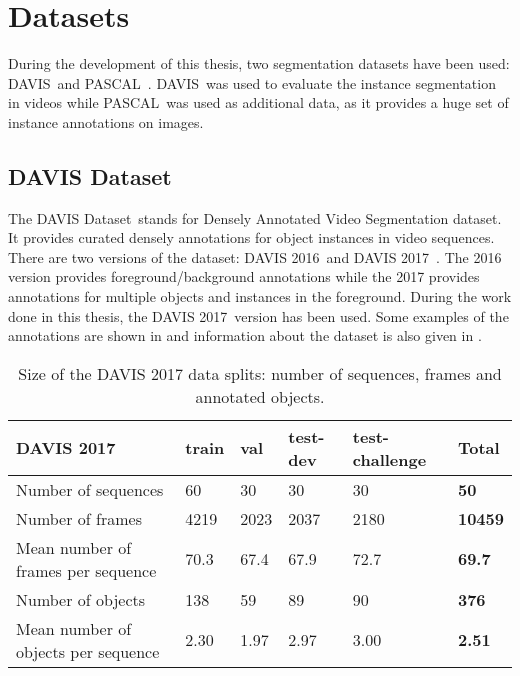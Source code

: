 \section{Datasets}

During the development of this thesis, two segmentation datasets have been used: DAVIS~\davisboth and PASCAL~\pascal.
DAVIS~\davisboth was used to evaluate the instance segmentation in videos while PASCAL~\pascal was used as additional data, as it provides a huge set of instance annotations on images.

\subsection{DAVIS Dataset}

The DAVIS Dataset~\davisboth stands for Densely Annotated Video Segmentation dataset.
It provides curated densely annotations for object instances in video sequences.
There are two versions of the dataset: DAVIS 2016~\davisold and DAVIS 2017~\davislast.
The 2016 version provides foreground/background annotations while the 2017 provides annotations for multiple objects and instances in the foreground.
During the work done in this thesis, the DAVIS 2017~\davislast version has been used.
Some examples of the annotations are shown in  and information about the dataset is also given in .

\begin{table}[h]
  \centering
  \begin{tabular}{l|llll|l}
    \toprule
    DAVIS 2017                          & train & val  & test-dev & test-challenge & \textbf{Total} \\
    \midrule
    Number of sequences                 & 60    & 30   & 30       & 30             & \textbf{50}    \\
    Number of frames                    & 4219  & 2023 & 2037     & 2180           & \textbf{10459} \\
    Mean number of frames per sequence  & 70.3  & 67.4 & 67.9     & 72.7           & \textbf{69.7}  \\
    Number of objects                   & 138   & 59   & 89       & 90             & \textbf{376}   \\
    Mean number of objects per sequence & 2.30  & 1.97 & 2.97     & 3.00           & \textbf{2.51} \\
    \bottomrule
  \end{tabular}
  \caption{Size of the DAVIS 2017 data splits: number of sequences, frames and annotated objects.}
  \label{tab:davis}
\end{table}

